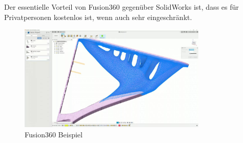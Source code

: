 \documentclass{article}
\begin{document}
    Der essentielle Vorteil von Fusion360 gegen\"uber SolidWorks ist, dass es f\"ur Privatpersonen
    kostenlos ist, wenn auch sehr eingeschr\"ankt.

    \begin{figure}[H]
        \centering
        \includegraphics[width=0.8\textwidth]{figures/software/fusion.jpg}
        \caption{Fusion360 Beispiel}
        \label{fig:fusion}
    \end{figure}














\newpage
\end{document}
